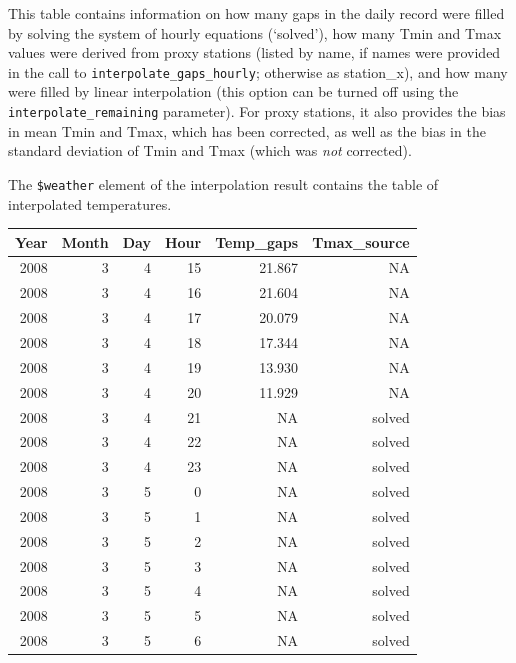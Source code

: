 \documentclass[
]{book}
\begin{document}
This table contains information on how many gaps in the daily record were filled by solving the system of hourly equations (`solved'), how many Tmin and Tmax values were derived from proxy stations (listed by name, if names were provided in the call to \texttt{interpolate\_gaps\_hourly}; otherwise as station\_x), and how many were filled by linear interpolation (this option can be turned off using the \texttt{interpolate\_remaining} parameter). For proxy stations, it also provides the bias in mean Tmin and Tmax, which has been corrected, as well as the bias in the standard deviation of Tmin and Tmax (which was \emph{not} corrected).

The \texttt{\$weather} element of the interpolation result contains the table of interpolated temperatures.

\begin{table}[H]
\centering\begingroup\fontsize{10}{12}\selectfont

\begin{tabular}{r|r|r|r|r|r}
\hline
Year & Month & Day & Hour & Temp\_gaps & Tmax\_source\\
\hline
2008 & 3 & 4 & 15 & 21.867 & NA\\
\hline
2008 & 3 & 4 & 16 & 21.604 & NA\\
\hline
2008 & 3 & 4 & 17 & 20.079 & NA\\
\hline
2008 & 3 & 4 & 18 & 17.344 & NA\\
\hline
2008 & 3 & 4 & 19 & 13.930 & NA\\
\hline
2008 & 3 & 4 & 20 & 11.929 & NA\\
\hline
2008 & 3 & 4 & 21 & NA & solved\\
\hline
2008 & 3 & 4 & 22 & NA & solved\\
\hline
2008 & 3 & 4 & 23 & NA & solved\\
\hline
2008 & 3 & 5 & 0 & NA & solved\\
\hline
2008 & 3 & 5 & 1 & NA & solved\\
\hline
2008 & 3 & 5 & 2 & NA & solved\\
\hline
2008 & 3 & 5 & 3 & NA & solved\\
\hline
2008 & 3 & 5 & 4 & NA & solved\\
\hline
2008 & 3 & 5 & 5 & NA & solved\\
\hline
2008 & 3 & 5 & 6 & NA & solved\\
\hline
\end{tabular}
\endgroup{}
\end{table}
\end{document}
